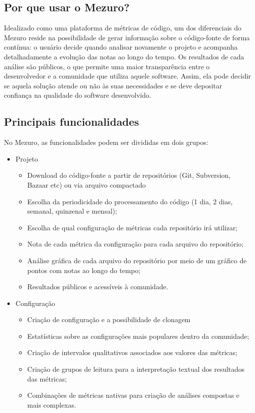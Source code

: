 \documentclass[12pt]{article}
\begin{document}
  \subsection{Por que usar o Mezuro?} \label{sec:projeto-mezuro}
  Idealizado como uma plataforma de métricas de código, um dos diferenciais do Mezuro reside na possibilidade de gerar informação sobre o código-fonte de forma contínua: o usuário decide quando analisar novamente o projeto e acompanha detalhadamente a evolução das notas ao longo do tempo. Os resultados de cada análise são públicos, o que permite uma maior transparência entre o desenvolvedor e a comunidade que utiliza aquele software. Assim, ela pode decidir se aquela solução atende ou não às suas necessidades e se deve depositar confiança na qualidade do software desenvolvido.

  \subsection{Principais funcionalidades}\label{sec:princ-funcionalidades}
  No Mezuro, as funcionalidades podem ser divididas em dois grupos:
  \begin{itemize}
    \item Projeto
      \begin{itemize}
      \item Download do código-fonte a partir de repositórios (Git, Subversion, Bazaar etc) ou via arquivo compactado
          \item Escolha da periodicidade do processamento do código (1 dia, 2 dias, semanal, quinzenal e mensal);
          \item Escolha de qual configuração de métricas cada repositório irá utilizar;
          \item Nota de cada métrica da configuração para cada arquivo do repositório;
          \item Análise gráfica de cada arquivo do repositório por meio de um gráfico de pontos com notas ao longo do tempo;
          \item Resultados públicos e acessíveis à comunidade.
      \end{itemize}
      \item Configuração
      \begin{itemize}
      \item Criação de configuração e a possibilidade de clonagem
          \item Estatísticas sobre as configurações mais populares dentro da comunidade;
          \item Criação de intervalos qualitativos associados aos valores das métricas;
          \item Criação de grupos de leitura para a interpretação textual dos resultados das métricas;
          \item Combinações de métricas nativas para criação de análises compostas e mais complexas.
      \end{itemize}
  \end{itemize}
\end{document}

